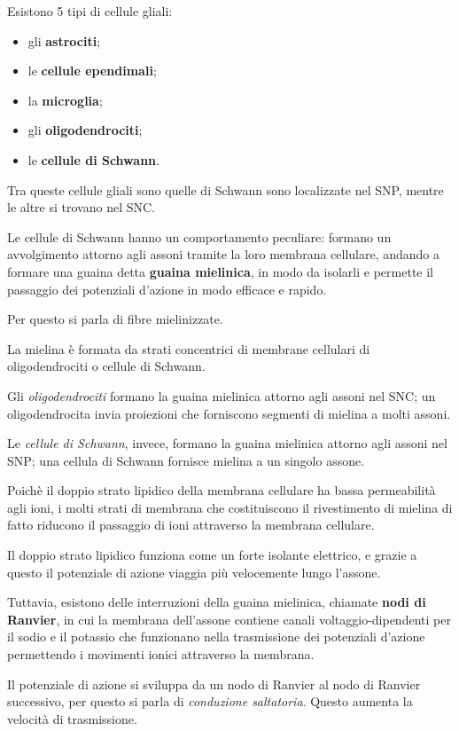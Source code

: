 \documentclass[]{article}
\begin{document}
Esistono 5 tipi di cellule gliali:

\begin{itemize}
\itemsep1pt\parskip0pt
\item
  gli \textbf{astrociti};
\item
  le \textbf{cellule ependimali};
\item
  la \textbf{microglia};
\item
  gli \textbf{oligodendrociti};
\item
  le \textbf{cellule di Schwann}.
\end{itemize}

Tra queste cellule gliali sono quelle di Schwann sono localizzate nel
SNP, mentre le altre si trovano nel SNC.

Le cellule di Schwann hanno un comportamento peculiare: formano un
avvolgimento attorno agli assoni tramite la loro membrana cellulare,
andando a formare una guaina detta \textbf{guaina mielinica}, in modo da
isolarli e permette il passaggio dei potenziali d'azione in modo
efficace e rapido.

Per questo si parla di fibre mielinizzate.

La mielina è formata da strati concentrici di membrane cellulari di
oligodendrociti o cellule di Schwann.

Gli \emph{oligodendrociti} formano la guaina mielinica attorno agli
assoni nel SNC; un oligodendrocita invia proiezioni che forniscono
segmenti di mielina a molti assoni.

Le \emph{cellule di Schwann}, invece, formano la guaina mielinica
attorno agli assoni nel SNP; una cellula di Schwann fornisce mielina a
un singolo assone.

Poichè il doppio strato lipidico della membrana cellulare ha bassa
permeabilità agli ioni, i molti strati di membrana che costituiscono il
rivestimento di mielina di fatto riducono il passaggio di ioni
attraverso la membrana cellulare.

Il doppio strato lipidico funziona come un forte isolante elettrico, e
grazie a questo il potenziale di azione viaggia più velocemente lungo
l'assone.

Tuttavia, esistono delle interruzioni della guaina mielinica, chiamate
\textbf{nodi di Ranvier}, in cui la membrana dell'assone contiene canali
voltaggio-dipendenti per il sodio e il potassio che funzionano nella
trasmissione dei potenziali d'azione permettendo i movimenti ionici
attraverso la membrana.

Il potenziale di azione si sviluppa da un nodo di Ranvier al nodo di
Ranvier successivo, per questo si parla di \emph{conduzione saltatoria}.
Questo aumenta la velocità di trasmissione.
\end{document}
